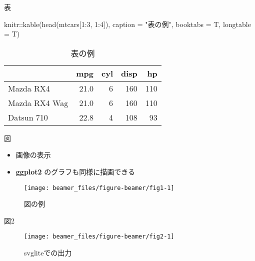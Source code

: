 \documentclass[
  12pt,
  ignorenonframetext,
]{beamer}
\newenvironment{Shaded}{\begin{snugshade}}{\end{snugshade}}
\newcommand{\AttributeTok}[1]{\textcolor[rgb]{0.77,0.63,0.00}{#1}}
\newcommand{\DecValTok}[1]{\textcolor[rgb]{0.00,0.00,0.81}{#1}}
\newcommand{\FunctionTok}[1]{\textcolor[rgb]{0.00,0.00,0.00}{#1}}
\newcommand{\NormalTok}[1]{#1}
\newcommand{\SpecialCharTok}[1]{\textcolor[rgb]{0.00,0.00,0.00}{#1}}
\newcommand{\StringTok}[1]{\textcolor[rgb]{0.31,0.60,0.02}{#1}}
\providecommand{\tightlist}{%
  \setlength{\itemsep}{0pt}\setlength{\parskip}{0pt}}
\begin{document}
\begin{frame}[fragile]{表}
\protect\hypertarget{ux8868}{}
\begin{Shaded}
\begin{Highlighting}[]
\NormalTok{knitr}\SpecialCharTok{::}\FunctionTok{kable}\NormalTok{(}\FunctionTok{head}\NormalTok{(mtcars[}\DecValTok{1}\SpecialCharTok{:}\DecValTok{3}\NormalTok{, }\DecValTok{1}\SpecialCharTok{:}\DecValTok{4}\NormalTok{]), }\AttributeTok{caption =} \StringTok{"表の例"}\NormalTok{, }\AttributeTok{booktabs =}\NormalTok{ T, }\AttributeTok{longtable =}\NormalTok{ T)}
\end{Highlighting}
\end{Shaded}

\begin{longtable}[t]{lrrrr}
\caption{\label{tab:tab1}表の例}\\
\toprule
  & mpg & cyl & disp & hp\\
\midrule
Mazda RX4 & 21.0 & 6 & 160 & 110\\
Mazda RX4 Wag & 21.0 & 6 & 160 & 110\\
Datsun 710 & 22.8 & 4 & 108 & 93\\
\bottomrule
\end{longtable}
\end{frame}

\begin{frame}{図}
\protect\hypertarget{ux56f3}{}
\begin{itemize}
\tightlist
\item
  画像の表示
\item
  \textbf{ggplot2} のグラフも同様に描画できる
\end{itemize}

\begin{figure}

{\centering \texttt{[image: beamer\_files/figure-beamer/fig1-1]} 

}

\caption{図の例}\label{fig:fig1}
\end{figure}
\end{frame}

\begin{frame}{図2}
\protect\hypertarget{ux56f32}{}
\begin{figure}

{\centering \texttt{[image: beamer\_files/figure-beamer/fig2-1]} 

}

\caption{svgliteでの出力}\label{fig:fig2}
\end{figure}
\end{frame}
\end{document}
